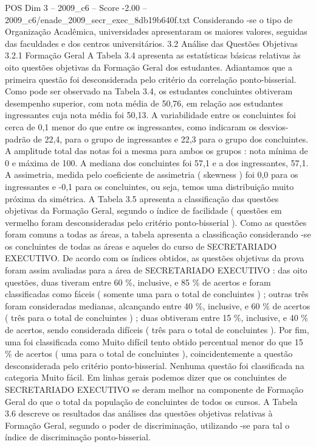 \begin{textsample}{POS Dim 3 – 2009\_c6 – Score -2.00 – 2009\_c6/enade\_2009\_secr\_exec\_8db19b640f.txt}
Considerando -se o tipo de Organização Acadêmica, universidades apresentaram os maiores valores, seguidas das faculdades e dos centros universitários. 3.2 Análise das Questões Objetivas 3.2.1 Formação Geral A Tabela 3.4 apresenta as estatísticas básicas relativas às oito questões objetivas da Formação Geral dos estudantes.
Adiantamos que a primeira questão foi desconsiderada pelo critério da correlação ponto-bisserial.
Como pode ser observado na Tabela 3.4, os estudantes concluintes obtiveram desempenho superior, com nota média de 50,76, em relação aos estudantes ingressantes cuja nota média foi 50,13.
A variabilidade entre os concluintes foi cerca de 0,1 menor do que entre os ingressantes, como indicaram os desvios-padrão de 22,4, para o grupo de ingressantes e 22,3 para o grupo dos concluintes.
A amplitude total das notas foi a mesma para ambos os grupos : nota mínima de 0 e máxima de 100.
A mediana dos concluintes foi 57,1 e a dos ingressantes, 57,1.
A assimetria, medida pelo coeficiente de assimetria ( skewness ) foi 0,0 para os ingressantes e -0,1 para os concluintes, ou seja, temos uma distribuição muito próxima da simétrica.
A Tabela 3.5 apresenta a classificação das questões objetivas da Formação Geral, segundo o índice de facilidade ( questões em vermelho foram desconsideradas pelo critério ponto-bisserial ).
Como as questões foram comuns a todas as áreas, a tabela apresenta a classificação considerando -se os concluintes de todas as áreas e aqueles do curso de SECRETARIADO EXECUTIVO.
De acordo com os índices obtidos, as questões objetivas da prova foram assim avaliadas para a área de SECRETARIADO EXECUTIVO : das oito questões, duas tiveram entre 60 \%, inclusive, e 85 \% de acertos e foram classificadas como fáceis ( somente uma para o total de concluintes ) ; outras três foram consideradas medianas, alcançando entre 40 \%, inclusive, e 60 \% de acertos ( três para o total de concluintes ) ; duas obtiveram entre 15 \%, inclusive, e 40 \% de acertos, sendo considerada difíceis ( três para o total de concluintes ).
Por fim, uma foi classificada como Muito difícil tento obtido percentual menor do que 15 \% de acertos ( uma para o total de concluintes ), coincidentemente a questão desconsiderada pelo critério ponto-bisserial.
Nenhuma questão foi classificada na categoria Muito fácil.
Em linhas gerais podemos dizer que os concluintes de SECRETARIADO EXECUTIVO se deram melhor na componente de Formação Geral do que o total da população de concluintes de todos os cursos.
A Tabela 3.6 descreve os resultados das análises das questões objetivas relativas à Formação Geral, segundo o poder de discriminação, utilizando -se para tal o índice de discriminação ponto-bisserial.

\end{textsample}
